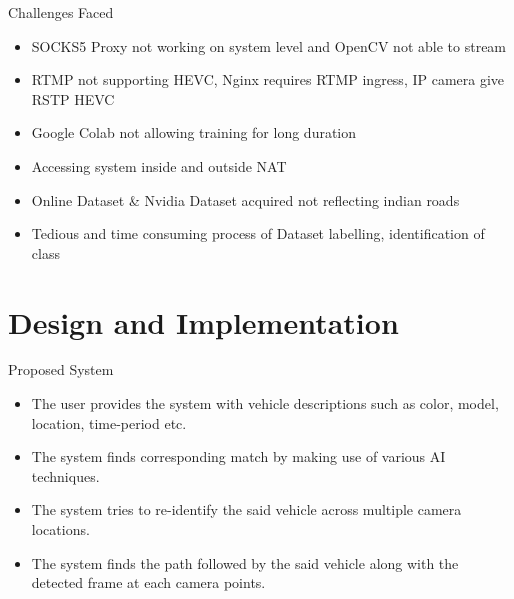\documentclass{beamer}
\begin{document}
	\begin{frame}{Challenges Faced}
		\begin{itemize}
			\item SOCKS5 Proxy not working on system level and OpenCV not able to stream
			\item RTMP not supporting HEVC, Nginx requires RTMP ingress, IP camera give RSTP HEVC 
   			\item Google Colab not allowing training for long duration
			\item Accessing system inside and outside NAT
			\item Online Dataset \& Nvidia Dataset acquired not reflecting indian roads
   			\item Tedious and time consuming process of Dataset labelling, identification of class 
		\end{itemize}
	\end{frame}
	
	
	
	\section{Design and Implementation}
	\begin{frame}{Proposed System}
		\begin{itemize}
			\item The user provides the system with vehicle descriptions such as color, model, location, time-period etc. 
			\item The system finds corresponding match by making use of various AI techniques. 
			\item The system tries to re-identify the said vehicle across multiple camera locations.
			\item The system finds the path followed by the said vehicle along with the detected frame at each camera points.
		\end{itemize}
	\end{frame}
\end{document}
